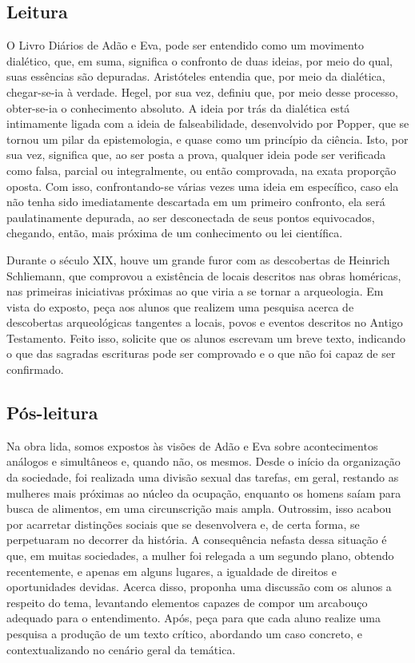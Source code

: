 \documentclass{extarticle}
\begin{document}
\subsection{Leitura}

O Livro Diários de Adão e Eva, pode ser entendido como um
movimento dialético, que, em suma, significa o confronto de duas ideias,
por meio do qual, suas essências são depuradas. Aristóteles entendia
que, por meio da dialética, chegar-se-ia à verdade. Hegel, por sua vez,
definiu que, por meio desse processo, obter-se-ia o conhecimento
absoluto. A ideia por trás da dialética está intimamente ligada com a
ideia de falseabilidade, desenvolvido por Popper, que se tornou um pilar
da epistemologia, e quase como um princípio da ciência. Isto, por sua
vez, significa que, ao ser posta a prova, qualquer ideia pode ser
verificada como falsa, parcial ou integralmente, ou então comprovada, na
exata proporção oposta. Com isso, confrontando-se várias vezes uma ideia
em específico, caso ela não tenha sido imediatamente descartada em um
primeiro confronto, ela será paulatinamente depurada, ao ser
desconectada de seus pontos equivocados, chegando, então, mais próxima
de um conhecimento ou lei científica.

Durante o século XIX, houve um grande furor com as descobertas de
Heinrich Schliemann, que comprovou a existência de locais descritos nas
obras homéricas, nas primeiras iniciativas próximas ao que viria a se
tornar a arqueologia. Em vista do exposto, peça aos alunos que realizem
uma pesquisa acerca de descobertas arqueológicas tangentes a locais,
povos e eventos descritos no Antigo Testamento. Feito isso, solicite que
os alunos escrevam um breve texto, indicando o que das sagradas
escrituras pode ser comprovado e o que não foi capaz de ser confirmado.

\subsection{Pós-leitura}

Na obra lida, somos expostos às visões de Adão e Eva sobre
acontecimentos análogos e simultâneos e, quando não, os mesmos. Desde o
início da organização da sociedade, foi realizada uma divisão sexual das
tarefas, em geral, restando as mulheres mais próximas ao núcleo da
ocupação, enquanto os homens saíam para busca de alimentos, em uma
circunscrição mais ampla. Outrossim, isso acabou por acarretar
distinções sociais que se desenvolvera e, de certa forma, se perpetuaram
no decorrer da história. A consequência nefasta dessa situação é que, em
muitas sociedades, a mulher foi relegada a um segundo plano, obtendo
recentemente, e apenas em alguns lugares, a igualdade de direitos e
oportunidades devidas. Acerca disso, proponha uma discussão com os
alunos a respeito do tema, levantando elementos capazes de compor um
arcabouço adequado para o entendimento. Após, peça para que cada aluno
realize uma pesquisa a produção de um texto crítico, abordando um caso
concreto, e contextualizando no cenário geral da temática.
\end{document}
